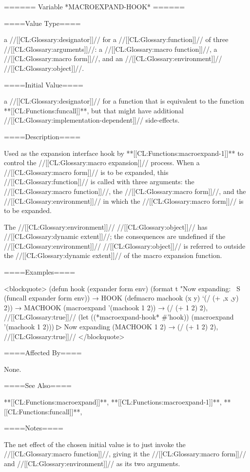 ====== Variable *MACROEXPAND-HOOK* ======

====Value Type====

a //[[CL:Glossary:designator]]// for a //[[CL:Glossary:function]]// of three //[[CL:Glossary:arguments]]//: a //[[CL:Glossary:macro function]]//, a //[[CL:Glossary:macro form]]//, and an //[[CL:Glossary:environment]]// //[[CL:Glossary:object]]//.

====Initial Value====

a //[[CL:Glossary:designator]]// for a function that is equivalent to the function **[[CL:Functions:funcall]]**, but that might have additional //[[CL:Glossary:implementation-dependent]]// side-effects.

====Description====

Used as the expansion interface hook by **[[CL:Functions:macroexpand-1]]** to control the //[[CL:Glossary:macro expansion]]// process. When a //[[CL:Glossary:macro form]]// is to be expanded, this //[[CL:Glossary:function]]// is called with three arguments: the //[[CL:Glossary:macro function]]//, the //[[CL:Glossary:macro form]]//, and the //[[CL:Glossary:environment]]// in which the //[[CL:Glossary:macro form]]// is to be expanded.

The //[[CL:Glossary:environment]]// //[[CL:Glossary:object]]// has //[[CL:Glossary:dynamic extent]]//; the consequences are undefined if the //[[CL:Glossary:environment]]// //[[CL:Glossary:object]]// is referred to outside the //[[CL:Glossary:dynamic extent]]// of the macro expansion function.


====Examples====

<blockquote> (defun hook (expander form env) (format t "Now expanding: ~S~ (funcall expander form env)) → HOOK (defmacro machook (x y) `(/ (+ ,x ,y) 2)) → MACHOOK (macroexpand '(machook 1 2)) → (/ (+ 1 2) 2), //[[CL:Glossary:true]]// (let ((*macroexpand-hook* #'hook)) (macroexpand '(machook 1 2)))
▷ Now expanding (MACHOOK 1 2) → (/ (+ 1 2) 2), //[[CL:Glossary:true]]// </blockquote>

====Affected By====

None.

====See Also====

**[[CL:Functions:macroexpand]]**, **[[CL:Functions:macroexpand-1]]**, **[[CL:Functions:funcall]]**, {\secref\Evaluation}

====Notes====

The net effect of the chosen initial value is to just invoke the //[[CL:Glossary:macro function]]//, giving it the //[[CL:Glossary:macro form]]// and //[[CL:Glossary:environment]]// as its two arguments.


